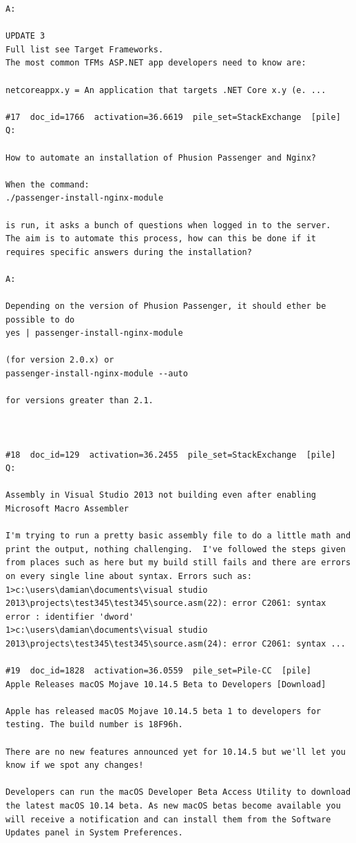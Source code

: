 \begin{verbatim}
A:

UPDATE 3
Full list see Target Frameworks.
The most common TFMs ASP.NET app developers need to know are:

netcoreappx.y = An application that targets .NET Core x.y (e. ...

#17  doc_id=1766  activation=36.6619  pile_set=StackExchange  [pile]
Q:

How to automate an installation of Phusion Passenger and Nginx?

When the command:
./passenger-install-nginx-module

is run, it asks a bunch of questions when logged in to the server.
The aim is to automate this process, how can this be done if it requires specific answers during the installation?

A:

Depending on the version of Phusion Passenger, it should ether be possible to do
yes | passenger-install-nginx-module

(for version 2.0.x) or
passenger-install-nginx-module --auto

for versions greater than 2.1.



#18  doc_id=129  activation=36.2455  pile_set=StackExchange  [pile]
Q:

Assembly in Visual Studio 2013 not building even after enabling Microsoft Macro Assembler

I'm trying to run a pretty basic assembly file to do a little math and print the output, nothing challenging.  I've followed the steps given from places such as here but my build still fails and there are errors on every single line about syntax. Errors such as:
1>c:\users\damian\documents\visual studio 2013\projects\test345\test345\source.asm(22): error C2061: syntax error : identifier 'dword'
1>c:\users\damian\documents\visual studio 2013\projects\test345\test345\source.asm(24): error C2061: syntax ...

#19  doc_id=1828  activation=36.0559  pile_set=Pile-CC  [pile]
Apple Releases macOS Mojave 10.14.5 Beta to Developers [Download]

Apple has released macOS Mojave 10.14.5 beta 1 to developers for testing. The build number is 18F96h.

There are no new features announced yet for 10.14.5 but we'll let you know if we spot any changes!

Developers can run the macOS Developer Beta Access Utility to download the latest macOS 10.14 beta. As new macOS betas become available you will receive a notification and can install them from the Software Updates panel in System Preferences.


\end{verbatim}
